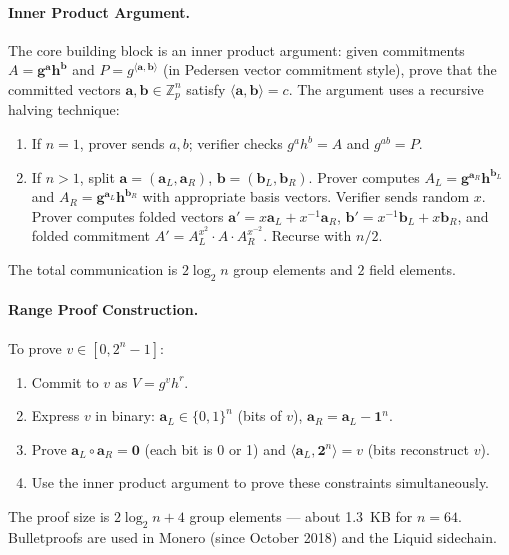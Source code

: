 \paragraph{Inner Product Argument.} The core building block is an inner product argument: given commitments $A = \mathbf{g}^{\mathbf{a}} \mathbf{h}^{\mathbf{b}}$ and $P = g^{\langle \mathbf{a}, \mathbf{b} \rangle}$ (in Pedersen vector commitment style), prove that the committed vectors $\mathbf{a}, \mathbf{b} \in \mathbb{Z}_p^n$ satisfy $\langle \mathbf{a}, \mathbf{b} \rangle = c$. The argument uses a recursive halving technique:
\begin{enumerate}
\item If $n=1$, prover sends $a, b$; verifier checks $g^{a} h^{b} = A$ and $g^{ab} = P$.
\item If $n>1$, split $\mathbf{a} = (\mathbf{a}_L, \mathbf{a}_R)$, $\mathbf{b} = (\mathbf{b}_L, \mathbf{b}_R)$. Prover computes $A_L = \mathbf{g}^{\mathbf{a}_R} \mathbf{h}^{\mathbf{b}_L}$ and $A_R = \mathbf{g}^{\mathbf{a}_L} \mathbf{h}^{\mathbf{b}_R}$ with appropriate basis vectors. Verifier sends random $x$. Prover computes folded vectors $\mathbf{a}' = x \mathbf{a}_L + x^{-1} \mathbf{a}_R$, $\mathbf{b}' = x^{-1} \mathbf{b}_L + x \mathbf{b}_R$, and folded commitment $A' = A_L^{x^2} \cdot A \cdot A_R^{x^{-2}}$. Recurse with $n/2$.
\end{enumerate}
The total communication is $2 \log_2 n$ group elements and $2$ field elements.

\paragraph{Range Proof Construction.} To prove $v \in [0, 2^n - 1]$:
\begin{enumerate}
\item Commit to $v$ as $V = g^v h^r$.
\item Express $v$ in binary: $\mathbf{a}_L \in \{0,1\}^n$ (bits of $v$), $\mathbf{a}_R = \mathbf{a}_L - \mathbf{1}^n$.
\item Prove $\mathbf{a}_L \circ \mathbf{a}_R = \mathbf{0}$ (each bit is 0 or 1) and $\langle \mathbf{a}_L, \mathbf{2}^n \rangle = v$ (bits reconstruct $v$).
\item Use the inner product argument to prove these constraints simultaneously.
\end{enumerate}
The proof size is $2 \log_2 n + 4$ group elements --- about 1.3~KB for $n=64$. Bulletproofs are used in Monero (since October 2018) and the Liquid sidechain.

